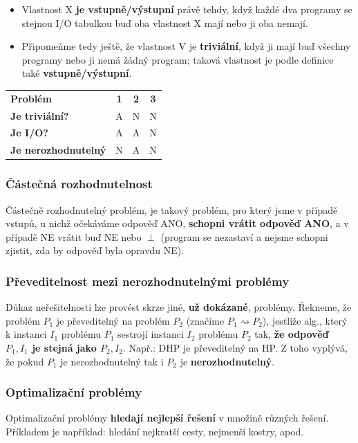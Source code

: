 \begin{itemize}
\item Vlastnost X \textbf{je vstupně/výstupní} právě tehdy, když každé dva programy se stejnou I/O tabulkou buď oba vlastnost X mají nebo ji oba nemají.
\item Připomeňme tedy ještě, že vlastnost V je \textbf{triviální}, když ji mají buď všechny programy nebo ji nemá žádný program; taková vlastnost je podle definice také \textbf{vstupně/výstupní}.
\end{itemize}

\begin{table}[H]
	\centering
	\begin{tabular}{l|c|c|c}
		\textbf{Problém}            & \textbf{1} & \textbf{2} & \textbf{3} \\\hhline
		\textbf{Je triviální?}      &     A       &      N      &      N      \\ 
		\textbf{Je I/O?}            &   A         &        A    &        N    \\
		\textbf{Je nerozhodnutelný} &         N   &       A     &           N
	\end{tabular}
\end{table}

\subsubsection{Částečná rozhodnutelnost}
Částečně rozhodnutelný problém, je takový problém, pro který jsme v případě vstupů, u nichž očekáváme odpověď ANO, \textbf{schopni vrátit odpověď ANO}, a v případě NE vrátit buď NE nebo $\perp$ (program se nezastaví a nejsme schopni zjistit, zda by odpověď byla opravdu NE).

\subsubsection{Převeditelnost mezi nerozhodnutelnými problémy}
Důkaz neřešitelnosti lze provést skrze jiné, \textbf{už dokázané}, problémy. Řekneme, že problém $P_1$ je převeditelný na problém $P_2$ (značíme $P_1 \rightsquigarrow P_2$), jestliže alg., který k instanci $I_1$ problému $P_1$ sestrojí instanci $I_2$ problému $P_2$ tak, \textbf{že odpověď $P_1, I_1$ je stejná jako $P_2, I_2$}. Např.: DHP je převeditelný na HP.  Z toho vyplývá, že pokud $P_1$ je nerozhodnutelný tak i $P_2$ je \textbf{nerozhodnutelný}.

\subsubsection{Optimalizační problémy}
Optimalizační problémy \textbf{hledají nejlepší řešení} v množině různých řešení. Příkladem je například: hledání nejkratší cesty, nejmenší kostry, apod.

